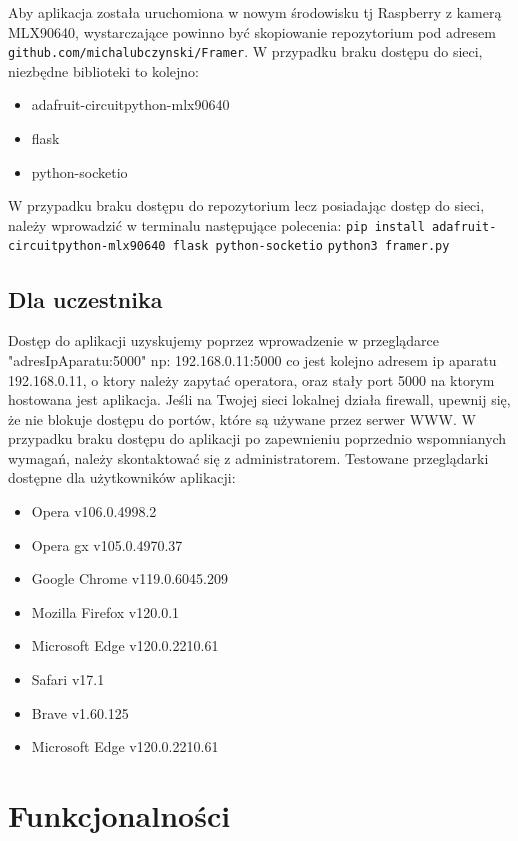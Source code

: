 \documentclass[a4paper,twoside,12pt]{book}
\begin{document}
Aby aplikacja została uruchomiona w nowym środowisku tj Raspberry z kamerą MLX90640, wystarczające powinno być skopiowanie repozytorium pod adresem \lstinline|github.com/michalubczynski/Framer|. W przypadku braku dostępu do sieci, niezbędne biblioteki to kolejno:
\begin{itemize}
\item adafruit-circuitpython-mlx90640
\item flask
\item python-socketio
\end{itemize}
W przypadku braku dostępu do repozytorium lecz posiadając dostęp do sieci, należy wprowadzić w terminalu następujące polecenia:
\newline
\lstinline|pip install adafruit-circuitpython-mlx90640 flask python-socketio|
\newline
\lstinline|python3 framer.py|


\section{Dla uczestnika}

Dostęp do aplikacji uzyskujemy poprzez wprowadzenie w przeglądarce "adresIpAparatu:5000" np: 192.168.0.11:5000 co jest kolejno adresem ip aparatu 192.168.0.11, o ktory należy zapytać operatora, oraz stały port 5000 na ktorym hostowana jest aplikacja. Jeśli na Twojej sieci lokalnej działa firewall, upewnij się, że nie blokuje dostępu do portów, które są używane przez serwer WWW. W przypadku braku dostępu do aplikacji po zapewnieniu poprzednio wspomnianych wymagań, należy skontaktować się z administratorem.
Testowane przeglądarki dostępne dla użytkowników aplikacji:
\begin{itemize}
\item Opera v106.0.4998.2	
\item Opera gx v105.0.4970.37
\item Google Chrome v119.0.6045.209
\item Mozilla Firefox v120.0.1
\item Microsoft Edge v120.0.2210.61
\item Safari v17.1
\item Brave v1.60.125
\item Microsoft Edge v120.0.2210.61
\end{itemize}


\chapter{Funkcjonalności}
\label{funkcjonalnosci}
\end{document}
